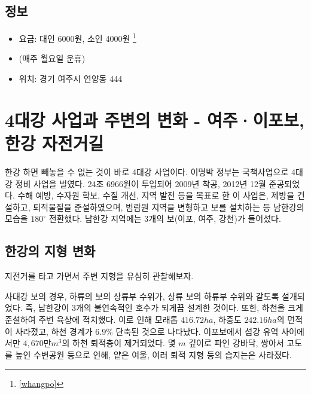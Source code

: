\subsection{정보}
\begin{itemize}
    \item 요금: 대인 6000원, 소인 4000원 \footnote{\ref{whangpo}}
    \item (매주 월요일 운휴)
    \item 위치: 경기 여주시 연양동 444
\end{itemize}

\section{4대강 사업과 주변의 변화 - 여주·이포보, 한강 자전거길}

한강 하면 빼놓을 수 없는 것이 바로 4대강 사업이다.
이명박 정부는 국책사업으로 4대강 정비 사업을 벌였다.
24조 6966원이 투입되어 2009년 착공, 2012년 12월 준공되었다.
수해 예방, 수자원 학보, 수질 개선, 지역 발전 등을 목표로 한 이 사업은,
제방을 건설하고, 퇴적물질을 준설하였으며, 범람원 지역을 변형하고 보를 설치하는 등
남한강의 모습을 $180^\circ$ 전환했다.
남한강 지역에는 3개의 보(이포, 여주, 강천)가 들어섰다.


\subsection{한강의 지형 변화}
지전거를 타고 가면서 주변 지형을 유심히 관찰해보자.

사대강 보의 경우, 하류의 보의 상류부 수위가, 상류 보의 하류부 수위와 같도록 설개되었다.
즉, 남한강이 3개의 불연속적인 호수가 되게끔 설계한 것이다. 또한, 하천을 크게 준설하여 주변 육상에 적치했다.
이로 인해 모래톱 $416.72ha$, 하중도 $242.16ha$의 면적이 사라졌고, 하천 경계가 $6.9\%$ 단축된 것으로 나타났다.
이포보에서 섬강 유역 사이에서만 $4,670만 m^3$의 하천 퇴적층이 제거되었다.
몇 $m$ 깊이로 파인 강바닥, 쌍아서 고도를 높인 수변공원 등으로 인해, 얕은 여울, 여러 퇴적 지형 등의 습지는은 사라졌다.   


